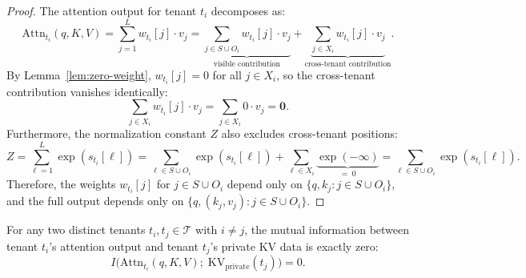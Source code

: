 \begin{proof}
The attention output for tenant $t_i$ decomposes as:
\begin{equation}
    \mathrm{Attn}_{t_i}(q, K, V) = \sum_{j=1}^{L} w_{t_i}[j] \cdot v_j
    = \underbrace{\sum_{j \in S \cup O_i} w_{t_i}[j] \cdot v_j}_{\text{visible contribution}}
    + \underbrace{\sum_{j \in X_i} w_{t_i}[j] \cdot v_j}_{\text{cross-tenant contribution}}.
\end{equation}
By Lemma~\ref{lem:zero-weight}, $w_{t_i}[j] = 0$ for all $j \in X_i$, so the
cross-tenant contribution vanishes identically:
\begin{equation}
    \sum_{j \in X_i} w_{t_i}[j] \cdot v_j = \sum_{j \in X_i} 0 \cdot v_j = \mathbf{0}.
\end{equation}
Furthermore, the normalization constant $Z$ also excludes cross-tenant positions:
\begin{equation}
    Z = \sum_{\ell=1}^{L} \exp(s_{t_i}[\ell])
      = \sum_{\ell \in S \cup O_i} \exp(s_{t_i}[\ell])
      + \sum_{\ell \in X_i} \underbrace{\exp(-\infty)}_{=\;0} = \sum_{\ell \in S \cup O_i} \exp(s_{t_i}[\ell]).
\end{equation}
Therefore, the weights $w_{t_i}[j]$ for $j \in S \cup O_i$ depend only on
$\{q, k_j : j \in S \cup O_i\}$, and the full output depends only on
$\{q, (k_j, v_j) : j \in S \cup O_i\}$.
\end{proof}

\begin{theorem}
\label{thm:isolation}
For any two distinct tenants $t_i, t_j \in \mathcal{T}$ with $i \neq j$, the mutual
information between tenant $t_i$'s attention output and tenant $t_j$'s private KV data
is exactly zero:
\begin{equation}
    I\!\big(\mathrm{Attn}_{t_i}(q, K, V);\; \mathrm{KV}_{\mathrm{private}}(t_j)\big) = 0.
\end{equation}
\end{theorem}

